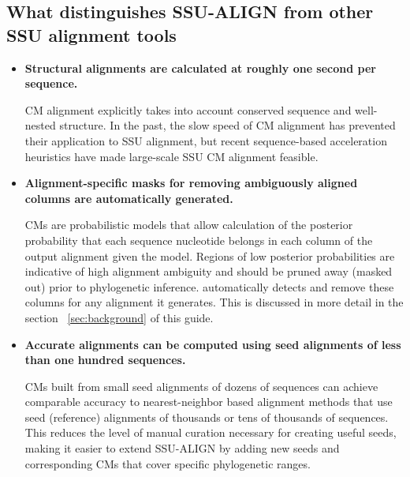 \subsection{What distinguishes SSU-ALIGN from other SSU
  alignment tools}


\begin{itemize}

\item \textbf{Structural alignments are calculated at roughly one
  second per sequence.}  

  CM alignment explicitly takes into account conserved sequence and
  well-nested structure. In the past, the slow speed of CM alignment
  has prevented their application to SSU alignment, but recent sequence-based
  acceleration heuristics \cite{Brown00,Nawrocki09b} have 
  made large-scale SSU CM alignment feasible.

\item \textbf{Alignment-specific masks for removing ambiguously aligned columns are
  automatically generated.}
  
  CMs are probabilistic models that allow calculation of the posterior
  probability that each sequence nucleotide belongs in each column of
  the output alignment given the model. Regions of low posterior
  probabilities are indicative of high alignment ambiguity and should
  be pruned away (masked out) prior to phylogenetic
  inference.  automatically detects and remove these
  columns for any alignment it generates. This is discussed in more
  detail in the section ~\ref{sec:background} of this guide.

\item \textbf{Accurate alignments can be computed using seed
  alignments of less than one hundred sequences.}

  CMs built from small seed alignments of dozens of sequences
  can achieve comparable accuracy to nearest-neighbor based alignment
  methods that use seed (reference) alignments of thousands or tens of
  thousands of sequences. This reduces the level of manual curation
  necessary for creating useful seeds, making it easier to extend
  SSU-ALIGN by adding new seeds and corresponding CMs that cover
  specific phylogenetic ranges. 

\end{itemize}


